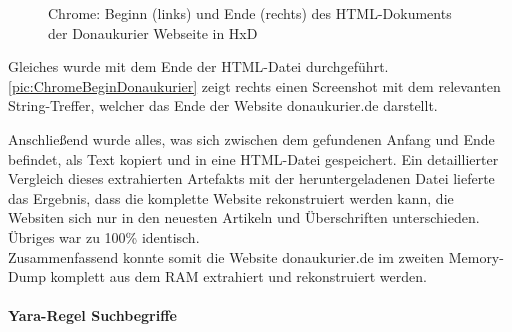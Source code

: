 \begin{figure}[h!]
	\centering
	\hfill
	\caption{Chrome: Beginn (links) und Ende (rechts) des HTML-Dokuments der Donaukurier Webseite in HxD}
	\label{pic:ChromeBeginDonaukurier}
\end{figure}

Gleiches wurde mit dem Ende der HTML-Datei durchgeführt. \autoref{pic:ChromeBeginDonaukurier} zeigt rechts einen Screenshot mit dem relevanten String-Treffer, welcher das Ende der Website donaukurier.de darstellt.

Anschließend wurde alles, was sich zwischen dem gefundenen Anfang und Ende befindet, als Text kopiert und in eine HTML-Datei gespeichert. Ein detaillierter Vergleich dieses extrahierten Artefakts mit der heruntergeladenen Datei lieferte das Ergebnis, dass die komplette Website rekonstruiert werden kann, die Websiten sich nur in den neuesten Artikeln und Überschriften unterschieden. Übriges war zu 100\% identisch. \\
Zusammenfassend konnte somit die Website \glqq{}donaukurier.de\grqq{} im zweiten Memory-Dump komplett aus dem RAM extrahiert und rekonstruiert werden.

\paragraph*{Yara-Regel \glqq{}Suchbegriffe\grqq{}}\label{chap:ergebnisse-chrome-uncommon-volatility-suchbegriffe}


